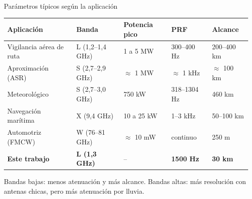 \begin{frame}{Parámetros típicos según la aplicación}
  \centering
  \small
  \renewcommand{\arraystretch}{1.15}
  \begin{tabular}{lllll}
    \toprule
    \textbf{Aplicación} & \textbf{Banda} & \textbf{Potencia pico} & \textbf{PRF} & \textbf{Alcance} \\
    \midrule
    Vigilancia aérea de ruta & L (1,2--1,4 GHz) & 1 a 5 MW & 300--400 Hz & 200--400 km \\
    Aproximación (ASR) & S (2,7--2,9 GHz) & $\approx$ 1 MW & $\approx$ 1 kHz & $\approx$ 100 km \\
    Meteorológico & S (2,7--3,0 GHz) & 750 kW & 318--1304 Hz & 460 km \\
    Navegación marítima & X (9,4 GHz) & 10 a 25 kW & 1--3 kHz & 50--100 km \\
    Automotriz (FMCW) & W (76--81 GHz) & $\approx$ 10 mW & continuo & 250 m \\
    \midrule
    \textbf{Este trabajo} & \textbf{L (1,3 GHz)} & -- & \textbf{1500 Hz} & \textbf{30 km} \\
    \bottomrule
  \end{tabular}
  \vspace{0.3cm}

  \raggedright\small
  Bandas bajas: menos atenuación y más alcance. Bandas altas: más resolución con antenas chicas, pero más atenuación por lluvia.
\end{frame}

